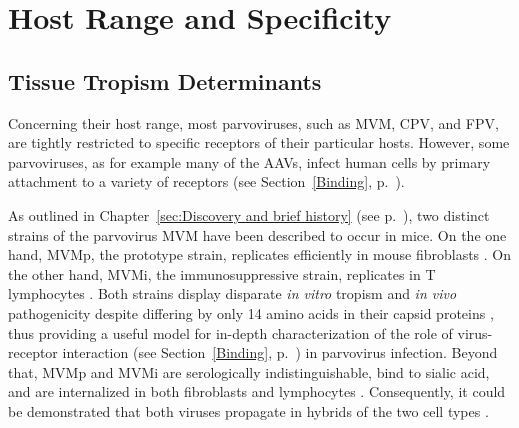 
\chapter{Host Range and Specificity} %

\label{Chapter6} %



\section{Tissue Tropism Determinants}

Concerning their host range, most parvoviruses, such as MVM,  CPV,  and FPV,  are tightly restricted to specific receptors of their particular hosts. However, some parvoviruses, as for example many of the AAVs,  infect human cells by primary attachment to a variety of receptors (see Section~\ref{Binding}, p.~\pageref{Binding}). 

As outlined in Chapter~\ref{sec:Discovery and brief history} (see p.~\pageref{sec:Discovery and brief history}), two distinct strains of the parvovirus MVM have been described to occur in mice. On the one hand, MVMp,  the prototype strain, replicates efficiently in mouse fibroblasts \cite{pmid5945715}. On the other hand, MVMi, the immunosuppressive strain, replicates in T lymphocytes \cite{pmid1244418, pmid6264106}.
Both strains display disparate \textit{in vitro} tropism and \textit{in vivo} pathogenicity despite differing by only 14 amino acids in their capsid proteins \cite{pmid1871965}, thus providing a useful model for in-depth characterization of the role of virus-receptor interaction (see Section~\ref{Binding}, p.~\pageref{Binding}) in parvovirus infection. Beyond that, MVMp and MVMi are serologically indistinguishable, bind to sialic acid, and are internalized in both fibroblasts and lymphocytes \cite{pmid6602221}. Consequently, it could be demonstrated that both viruses propagate in hybrids of the two cell types \cite{pmid6602222}.    

